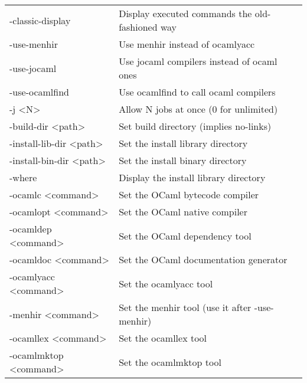 \documentclass[11pt]{article}
\begin{document}
\begin{table}[htb]
\begin{center}
\begin{tabular}{ll}
 -classic-display            &  Display executed commands the old-fashioned way                               \\
 -use-menhir                 &  Use menhir instead of ocamlyacc                                               \\
 -use-jocaml                 &  Use jocaml compilers instead of ocaml ones                                    \\
 -use-ocamlfind              &  Use ocamlfind to call ocaml compilers                                         \\
 -j <N>                      &  Allow N jobs at once (0 for unlimited)                                        \\
\hline
 -build-dir <path>           &  Set build directory (implies no-links)                                        \\
 -install-lib-dir <path>     &  Set the install library directory                                             \\
 -install-bin-dir <path>     &  Set the install binary directory                                              \\
 -where                      &  Display the install library directory                                         \\
 -ocamlc <command>           &  Set the OCaml bytecode compiler                                               \\
 -ocamlopt <command>         &  Set the OCaml native compiler                                                 \\
 -ocamldep <command>         &  Set the OCaml dependency tool                                                 \\
 -ocamldoc <command>         &  Set the OCaml documentation generator                                         \\
 -ocamlyacc <command>        &  Set the ocamlyacc tool                                                        \\
 -menhir <command>           &  Set the menhir tool (use it after -use-menhir)                                \\
 -ocamllex <command>         &  Set the ocamllex tool                                                         \\
 -ocamlmktop <command>       &  Set the ocamlmktop tool                                                       \\

\end{tabular}
\end{center}
\end{table}
\end{document}
